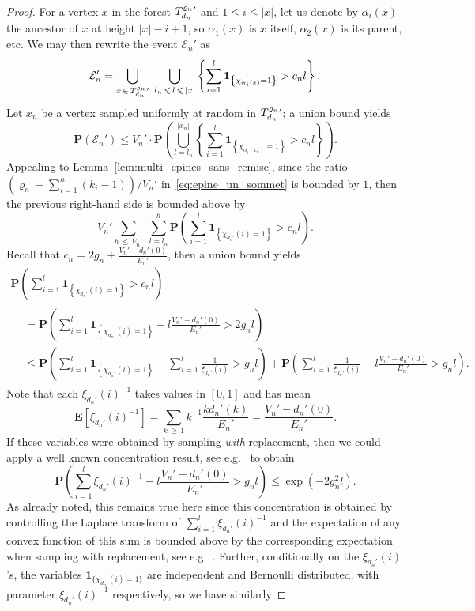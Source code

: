 \documentclass[AHL,Unicode,longabstracts,published]{cedram}
\newcommand{\ensembles}[1]{\mathbf{#1}}
\renewcommand{\P}{\ensembles{P}}
\newcommand{\E}{\ensembles{E}}
\renewcommand{\Pr}[1]{\P\left(#1\right)}
\newcommand{\Es}[1]{\E\left[#1\right]}
\newcommand{\1}{\ensembles{1}}
\newcommand{\ind}[1]{\1_{\{#1\}}}
\renewcommand{\le}{\leqslant}
\renewcommand{\ge}{\geqslant}
\newcommand{\clE}{\mathcal{E}}
\newcommand{\fn}{T_{d_n}^{\varrho_n}}
\newcommand{\edges}{E}
\newcommand{\vertices}{V}
\begin{document}
\begin{proof}
For a vertex $x$ in the forest ${\fn}\vphantom{T}'$ and $1 \le i \le |x|$, let us denote by $\alpha_i(x)$ the ancestor of $x$ at height $|x|-i+1$, so $\alpha_1(x)$ is $x$ itself, $\alpha_2(x)$ is its parent, etc. We may then rewrite the event $\clE_{n}'$ as
\[
\clE_n' = \bigcup_{x\,\in\,{\fn}\vphantom{T}'}\; \bigcup_{l_n\,\le\,l\,\le\,|x|} \left\{\sum_{i=1}^l \1_{\left\{\chi_{\alpha_i(x)} = 1\right\}} > c_n l\right\}.
\]
Let $x_n$ be a vertex sampled uniformly at random in ${\fn}\vphantom{T}'$; a union bound yields
\[
\Pr{\clE_n'}
\le \vertices_n' \cdot \Pr{\bigcup_{l = l_n}^{|x_n|} \left\{\sum_{i=1}^l \1_{\left\{\chi_{\alpha_i(x_n)} = 1\right\}} > c_n l\right\}}.
\]
Appealing to Lemma~\ref{lem:multi_epines_sans_remise}, since the ratio $(\varrho_n + \sum_{i=1}^h (k_i - 1))/\vertices_n'$ in~\eqref{eq:epine_un_sommet} is bounded by $1$, then the previous right-hand side is bounded above by
\[
\vertices_n' \sum_{h\,\le\,\vertices_n'}\; \sum_{l = l_n}^h \Pr{\sum_{i=1}^l \1_{\left\{\chi_{d_n'}(i) = 1\right\}} > c_n l}.
\]
Recall that $c_n = 2g_n + \frac{\vertices_n'-d_{n}'(0)}{\edges_n'}$, then a union bound yields
\begin{multline*}
\Pr{\sum_{i=1}^l \1_{\left\{\chi_{d_n'}(i) = 1\right\}} > c_n l}
\\
\begin{aligned}
&= \Pr{\sum_{i=1}^l \1_{\left\{\chi_{d_n'}(i) = 1\right\}} - l \frac{\vertices_n'-d_{n}'(0)}{\edges_n'} > 2g_n l}
\\
&\le \Pr{\sum_{i=1}^l \1_{\left\{\chi_{d_n'}(i) = 1\right\}} - \sum_{i=1}^l \frac{1}{\xi_{d_n'}(i)} > g_nl} + \Pr{\sum_{i=1}^l \frac{1}{\xi_{d_n'}(i)} - l \frac{\vertices_n'-d_{n}'(0)}{\edges_n'} > g_nl}.
\end{aligned}
\end{multline*}
Note that each $\xi_{d_n'}(i)^{-1}$ takes values in $[0,1]$ and has mean
\[
\Es{\xi_{d_n'}(i)^{-1}} = \sum_{k\,\ge\,1} k^{-1} \frac{k d_n'(k)}{\edges_{n}'} = \frac{\vertices_{n}'-d_{n}'(0)}{\edges_{n}'}.
\]
If these variables were obtained by sampling \emph{with} replacement, then we could apply a well known concentration result, see e.g.~\cite[Theorem~2.3]{McD98} to obtain
\[
\Pr{\sum_{i=1}^l \xi_{d_n'}(i)^{-1} - l \frac{\vertices_{n}'-d_{n}'(0)}{\edges_{n}'} > g_nl}
\le \exp\left(- 2 g_n^2 l\right).
\]
As already noted, this remains true here since this concentration is obtained by controlling the Laplace transform of $\sum_{i=1}^l \xi_{d_n'}(i)^{-1}$ and the expectation of any convex function of this sum is bounded above by the corresponding expectation when sampling with replacement, see e.g.~\cite[Proposition~20.6]{Ald85}. Further, conditionally on the $\xi_{d_n'}(i)$'s, the variables $\ind{\chi_{d_n'}(i) = 1}$ are independent and Bernoulli distributed, with parameter $\xi_{d_n'}(i)^{-1}$ respectively, so we have similarly

\end{proof}
\end{document}
